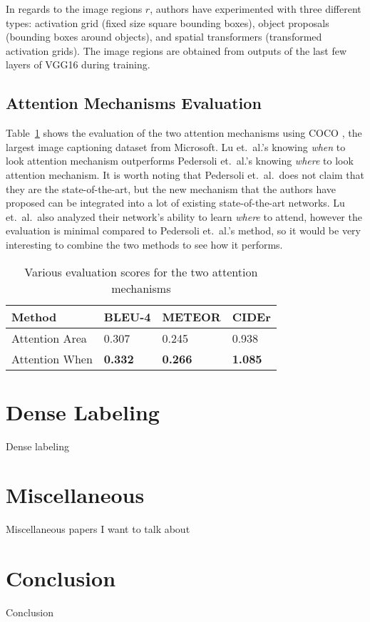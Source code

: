 \documentclass[10pt,twocolumn,letterpaper]{article}
\newcommand{\tabref}[1]{Table~\ref{tab:#1}}
\begin{document}
In regards to the image regions $r$, authors have experimented with three
different types: activation grid (fixed size square bounding boxes), object
proposals (bounding boxes around objects), and spatial transformers
(transformed activation grids). The image regions are obtained from outputs of
the last few layers of VGG16 during training.

\subsection{Attention Mechanisms Evaluation}
\tabref{attention} shows the evaluation of the two attention mechanisms using
COCO \cite{coco}, the largest image captioning dataset from Microsoft. Lu et.\
al.'s knowing \textit{when} to look attention mechanism outperforms Pedersoli
et.\ al.'s knowing \textit{where} to look attention mechanism. It is worth
noting that Pedersoli et.\ al.\ does not claim that they are the
state-of-the-art, but the new mechanism that the authors have proposed can be
integrated into a lot of existing state-of-the-art networks. Lu et.\ al.\ also
analyzed their network's ability to learn \textit{where} to attend, however the
evaluation is minimal compared to Pedersoli et.\ al.'s method, so it would be
very interesting to combine the two methods to see how it performs.
%
\begin{table}[]
\centering
\caption{Various evaluation scores for the two attention mechanisms}
\label{tab:attention}
\begin{tabular}{llll}
	\toprule
	Method         & BLEU-4         & METEOR         & CIDEr          \\
	\hline
	Attention Area & 0.307          & 0.245          & 0.938          \\
	Attention When & \textbf{0.332} & \textbf{0.266} & \textbf{1.085} \\
	\bottomrule
\end{tabular}
\end{table}
%
\section{Dense Labeling}

Dense labeling

\section{Miscellaneous}

Miscellaneous papers I want to talk about

\section{Conclusion}

Conclusion

{\small


}
\end{document}
